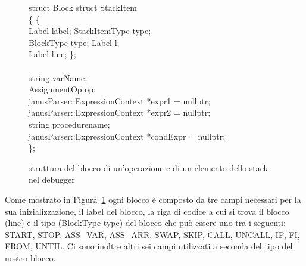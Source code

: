 \documentclass{article}
\theoremstyle{plain}
\theoremstyle{definition}
\theoremstyle{plain}
\begin{document}
\begin{figure}[h]
    \centering
    \begin{minipage}{0.95\textwidth}
        \ttfamily 
        struct Block \hspace*{10em} struct StackItem\\
        \{ \hspace*{15.5em} \{ \\
        \hspace*{1em} Label label; \hspace*{9.5em} StackItemType type; \\
        \hspace*{1em} BlockType type; \hspace*{8em} Label l; \\
        \hspace*{1em} Label line; \hspace*{9em} \}; \\
        \\
        \hspace*{1em} string varName; \\
        \hspace*{1em} AssignmentOp op;\\
        \hspace*{1em} janusParser::ExpressionContext *expr1 = nullptr; \\
        \hspace*{1em} janusParser::ExpressionContext *expr2 = nullptr; \\
        \hspace*{1em} string procedurename; \\
        \hspace*{1em} janusParser::ExpressionContext *condExpr = nullptr;\\
        \}; \\
    \end{minipage}
    \caption{struttura del blocco di un'operazione e di un elemento dello stack nel debugger}
    \label{fig:block}
\end{figure}

Come mostrato in Figura~\ref{fig:block} ogni blocco è composto da tre campi necessari per la sua inizializzazione, il label del blocco, la riga di codice a cui si trova il blocco (line) e il tipo (BlockType type) del blocco che può essere uno tra i seguenti: START, STOP, ASS\_VAR, ASS\_ARR, SWAP, SKIP, CALL, UNCALL, IF, FI, FROM, UNTIL. Ci sono inoltre altri sei campi utilizzati a seconda del tipo del nostro blocco.
\end{document}
